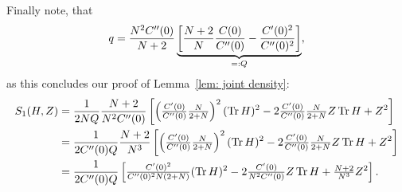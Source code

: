 Finally note, that
\[
	q = \frac{N^2C''(0)}{N+2}
	\underbrace{
	\left[
		\frac{N +2}{N}\frac{C(0)}{C''(0)} - \frac{C'(0)^2}{C''(0)^2}
	\right]
	}_{=:Q},
\]
as this concludes our proof of Lemma~\ref{lem: joint density}:
\begin{align*}
	S_1(H, Z)
	&= \frac1{2N Q}\frac{N+2}{N^2C''(0)}
	\left[
		\left(\tfrac{C'(0)}{C''(0)}\tfrac{N}{2+N}\right)^2(\operatorname{Tr} H)^2
		- 2\tfrac{C'(0)}{C''(0)}\tfrac{N}{2+N}Z \operatorname{Tr} H
		+ Z^2
	\right]\\
	&= \frac1{2C''(0)Q}\frac{N+2}{N^3}
	\left[
		\left(\tfrac{C'(0)}{C''(0)}\tfrac{N}{2+N}\right)^2(\operatorname{Tr} H)^2
		- 2\tfrac{C'(0)}{C''(0)}\tfrac{N}{2+N} Z\operatorname{Tr} H
		+ Z^2
	\right]\\
	&= \frac1{2C''(0)Q}
	\left[
		\tfrac{C'(0)^2}{C''(0)^2N(2+N)}(\operatorname{Tr} H)^2
		- 2\tfrac{C'(0)}{N^2C''(0)}Z\operatorname{Tr} H
		+ \tfrac{N+2}{N^3}Z^2
	\right].
\end{align*}